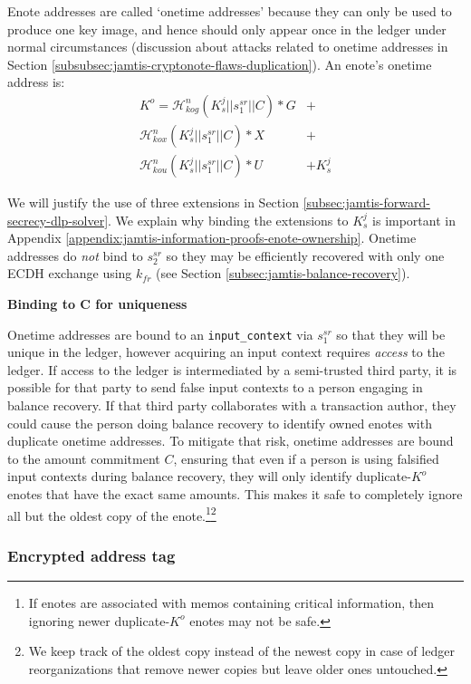 Enote addresses are called `onetime addresses' because they can only be used to produce one key image, and hence should only appear once in the ledger under normal circumstances (discussion about attacks related to onetime addresses in Section \ref{subsubsec:jamtis-cryptonote-flaws-duplication}). An enote's onetime address is:\vspace{.115cm}
\begin{align*}
    K^o = \mathcal{H}^n_{kog}(K^j_s || s^{sr}_1 || C)*G &+ \\
    \mathcal{H}^n_{kox}(K^j_s || s^{sr}_1 || C)*X &+ \\
    \mathcal{H}^n_{kou}(K^j_s || s^{sr}_1 || C)*U &+ K^j_s
\end{align*}

We will justify the use of three extensions in Section \ref{subsec:jamtis-forward-secrecy-dlp-solver}. We explain why binding the extensions to $K^j_s$ is important in Appendix \ref{appendix:jamtis-information-proofs-enote-ownership}. Onetime addresses do {\em not} bind to $s^{sr}_2$ so they may be efficiently recovered with only one ECDH exchange using $k_{fr}$ (see Section \ref{subsec:jamtis-balance-recovery}).

\textbf{Binding to C for uniqueness}

Onetime addresses are bound to an {\tt input\_context} via $s^{sr}_1$ so that they will be unique in the ledger, however acquiring an input context requires {\em access} to the ledger. If access to the ledger is intermediated by a semi-trusted third party, it is possible for that party to send false input contexts to a person engaging in balance recovery. If that third party collaborates with a transaction author, they could cause the person doing balance recovery to identify owned enotes with duplicate onetime addresses. To mitigate that risk, onetime addresses are bound to the amount commitment $C$, ensuring that even if a person is using falsified input contexts during balance recovery, they will only identify duplicate-$K^o$ enotes that have the exact same amounts. This makes it safe to completely ignore all but the oldest copy of the enote.\footnote{If enotes are associated with memos containing critical information, then ignoring newer duplicate-$K^o$ enotes may not be safe.}\footnote{We keep track of the oldest copy instead of the newest copy in case of ledger reorganizations that remove newer copies but leave older ones untouched.}

\subsubsection{Encrypted address tag}
\label{subsubsec:jamtis-enote-construction-encrypted-addr-tag}

